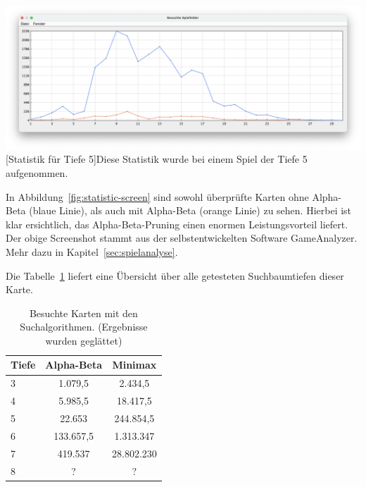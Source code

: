 \vspace{1em}
\begin{minipage}{\linewidth}
    \centering
    \includegraphics[width=0.9\linewidth]{statistic/Test-D5-01/ST-01-D5-LD}
    [Statistik für Tiefe 5]{Diese Statistik wurde bei einem Spiel der Tiefe 5 aufgenommen.}
    \label{fig:statistic-screen}
\end{minipage}

In Abbildung~\ref{fig:statistic-screen} sind sowohl \"uberpr\"ufte Karten ohne Alpha-Beta (blaue Linie), als auch mit Alpha-Beta (orange Linie) zu sehen.
Hierbei ist klar ersichtlich, das Alpha-Beta-Pruning einen enormen Leistungsvorteil liefert.
Der obige Screenshot stammt aus der selbstentwickelten Software GameAnalyzer.
Mehr dazu in Kapitel~\ref{sec:spielanalyse}.

Die Tabelle~\ref{tab:search-depth} liefert eine \"Ubersicht \"uber alle getesteten Suchbaumtiefen dieser Karte.

\vspace{1em}
\begin{table}[!h]
    \centering
    \begin{tabular}{|l|c|c|}
        \hline
        \textbf{Tiefe} & \textbf{Alpha-Beta} & \textbf{Minimax}\\
        \hline
        3 & 1.079,5 & 2.434,5\\
        \hline
        4 & 5.985,5 & 18.417,5\\
        \hline
        5 & 22.653 & 244.854,5\\
        \hline
        6 & 133.657,5 & 1.313.347\\
        \hline
        7 & 419.537 & 28.802.230\\
        \hline
        8 & ? & ?\\
        \hline
    \end{tabular}
    \caption{Besuchte Karten mit den Suchalgorithmen. (Ergebnisse wurden geglättet)}
    \label{tab:search-depth}
\end{table}

